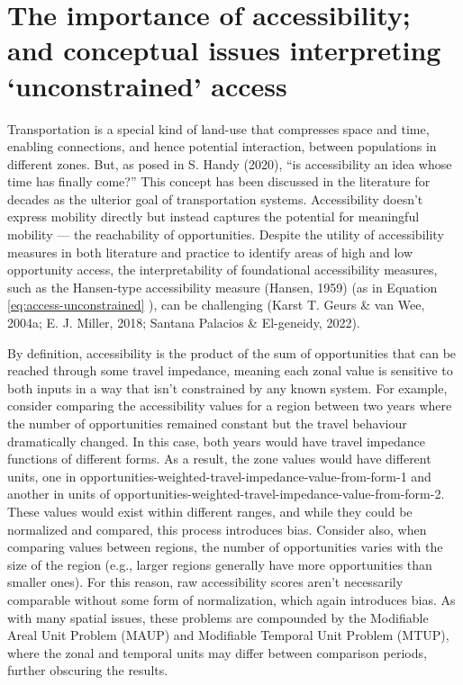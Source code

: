 \documentclass[
11pt, %
oneside, %
english, %
singlespacing, %
]{macthesis} %
\begin{document}
\section{The importance of accessibility; and conceptual issues interpreting `unconstrained' access}\label{the-importance-of-accessibility-and-conceptual-issues-interpreting-unconstrained-access}

Transportation is a special kind of land-use that compresses space and time, enabling connections, and hence potential interaction, between populations in different zones. But, as posed in S. Handy (2020), ``is accessibility an idea whose time has finally come?'' This concept has been discussed in the literature for decades as the ulterior goal of transportation systems. Accessibility doesn't express mobility directly but instead captures the potential for meaningful mobility --- the reachability of opportunities. Despite the utility of accessibility measures in both literature and practice to identify areas of high and low opportunity access, the interpretability of foundational accessibility measures, such as the Hansen-type accessibility measure (Hansen, 1959) (as in Equation \ref{eq:access-unconstrained} ), can be challenging (Karst T. Geurs \& van Wee, 2004a; E. J. Miller, 2018; Santana Palacios \& El-geneidy, 2022).

By definition, accessibility is the product of the sum of opportunities that can be reached through some travel impedance, meaning each zonal value is sensitive to both inputs in a way that isn't constrained by any known system. For example, consider comparing the accessibility values for a region between two years where the number of opportunities remained constant but the travel behaviour dramatically changed. In this case, both years would have travel impedance functions of different forms. As a result, the zone values would have different units, one in opportunities-weighted-travel-impedance-value-from-form-1 and another in units of opportunities-weighted-travel-impedance-value-from-form-2. These values would exist within different ranges, and while they could be normalized and compared, this process introduces bias. Consider also, when comparing values between regions, the number of opportunities varies with the size of the region (e.g., larger regions generally have more opportunities than smaller ones). For this reason, raw accessibility scores aren't necessarily comparable without some form of normalization, which again introduces bias. As with many spatial issues, these problems are compounded by the Modifiable Areal Unit Problem (MAUP) and Modifiable Temporal Unit Problem (MTUP), where the zonal and temporal units may differ between comparison periods, further obscuring the results.
\end{document}
